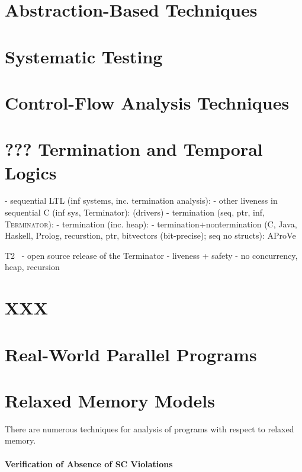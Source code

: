\section{Abstraction-Based Techniques}

\section{Systematic Testing}

\section{Control-Flow Analysis Techniques}

\section{??? Termination and Temporal Logics}

- sequential LTL (inf systems, inc. termination analysis): \cite{Dietsch2015}
- other liveness in sequential C (inf sys, Terminator): \cite{Cook2007} (drivers)
- termination (seq, ptr, inf, \textsc{Terminator}): \cite{Cook2006}
- termination (inc. heap): \cite{Berdine2006}
- termination+nontermination (C, Java, Haskell, Prolog, recurstion, ptr, bitvectors (bit-precise); seq no structs): AProVe \cite{Hensel2017, Giesl2017}

T2~\cite{Brockschmidt2016}
- open source release of the Terminator
- liveness + safety
- no concurrency, heap, recursion

\section{XXX}

\section{Real-World Parallel Programs}


\section{Relaxed Memory Models}

There are numerous techniques for analysis of programs with respect to relaxed memory.

\paragraph{Verification of Absence of SC Violations}

